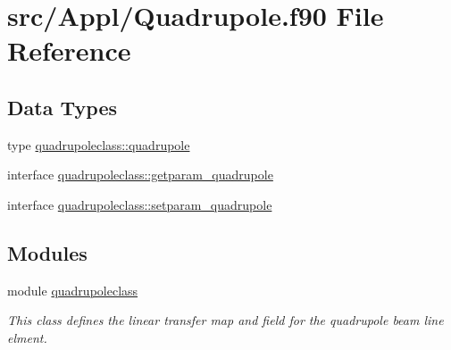 \hypertarget{_quadrupole_8f90}{}\section{src/\+Appl/\+Quadrupole.f90 File Reference}
\label{_quadrupole_8f90}
\subsection*{Data Types}
\begin{DoxyCompactItemize}
\item 
type \mbox{\hyperlink{namespacequadrupoleclass_structquadrupoleclass_1_1quadrupole}{quadrupoleclass\+::quadrupole}}
\item 
interface \mbox{\hyperlink{interfacequadrupoleclass_1_1getparam__quadrupole}{quadrupoleclass\+::getparam\+\_\+quadrupole}}
\item 
interface \mbox{\hyperlink{interfacequadrupoleclass_1_1setparam__quadrupole}{quadrupoleclass\+::setparam\+\_\+quadrupole}}
\end{DoxyCompactItemize}
\subsection*{Modules}
\begin{DoxyCompactItemize}
\item 
module \mbox{\hyperlink{namespacequadrupoleclass}{quadrupoleclass}}
\begin{DoxyCompactList}\small\item\em This class defines the linear transfer map and field for the quadrupole beam line elment. \end{DoxyCompactList}\end{DoxyCompactItemize}
